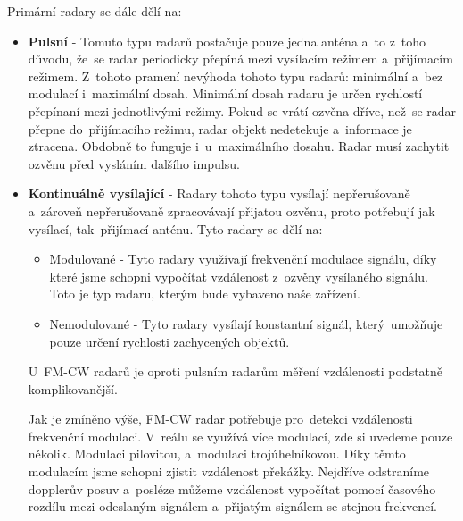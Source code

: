 			Primární radary se dále dělí na:
			\begin{itemize}
				\item \textbf{Pulsní}	-	Tomuto typu radarů postačuje pouze jedna anténa a~to z~toho důvodu, že~se radar periodicky přepíná mezi vysílacím režimem a~přijímacím režimem. Z~tohoto pramení nevýhoda tohoto typu radarů: minimální a~bez modulací i~maximální dosah. Minimální dosah radaru je určen rychlostí přepínaní mezi jednotlivými režimy. Pokud se vrátí ozvěna dříve, než~se radar přepne do~přijímacího režimu, radar objekt nedetekuje a~informace je ztracena. Obdobně to funguje i~u~maximálního dosahu. Radar musí zachytit ozvěnu před vysláním dalšího impulsu.
				
				\item \textbf{Kontinuálně vysílající}	-	Radary tohoto typu vysílají nepřerušovaně a~zároveň nepřerušovaně zpracovávají přijatou ozvěnu, proto potřebují jak vysílací, tak~přijímací anténu. Tyto radary se dělí na:
					
					\begin{itemize}
						\item Modulované - Tyto radary využívají frekvenční modulace signálu, díky které jsme schopni vypočítat vzdálenost z~ozvěny vysílaného signálu. Toto je typ radaru, kterým bude vybaveno naše zařízení.
						
						\item Nemodulované - Tyto radary vysílají konstantní signál, který~umožňuje pouze určení rychlosti zachycených objektů.
					\end{itemize}
					
					U~FM-CW\footnotemark{} radarů je oproti pulsním radarům měření vzdálenosti podstatně komplikovanější.\par
					Jak je zmíněno výše, FM-CW radar potřebuje pro~detekci vzdálenosti frekvenční modulaci. V~reálu se využívá více modulací, zde si uvedeme pouze několik. Modulaci pilovitou, a~modulaci trojúhelníkovou. Díky těmto modulacím jsme schopni zjistit vzdálenost překážky. Nejdříve odstraníme dopplerův posuv a~posléze můžeme vzdálenost vypočítat pomocí časového rozdílu mezi odeslaným signálem a~přijatým signálem se stejnou frekvencí. 
					

\end{itemize}
